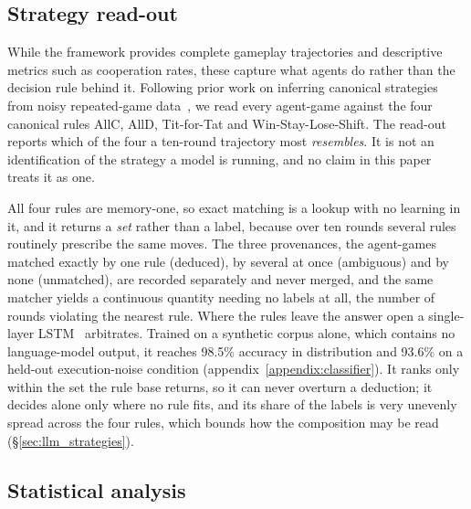 \documentclass[11pt,a4paper]{article}
\begin{document}
\subsection{Strategy read-out}\label{sec:readout}

While the framework provides complete gameplay trajectories and descriptive
metrics such as cooperation rates, these capture what agents do rather than the
decision rule behind it. Following prior work on inferring canonical strategies
from noisy repeated-game data~\cite{han2011role,Han2012ALIFEjournal,diStefanoIntention2023},
we read every agent-game against the four canonical rules AllC, AllD,
Tit-for-Tat and Win-Stay-Lose-Shift. The read-out reports which of the four a
ten-round trajectory most \emph{resembles}. It is not an identification of the
strategy a model is running, and no claim in this paper treats it as one.

All four rules are memory-one, so exact matching is a lookup with no learning
in it, and it returns a \emph{set} rather than a label, because over ten rounds
several rules routinely prescribe the same moves. The three provenances, the
agent-games matched exactly by one rule (deduced), by several at once
(ambiguous) and by none (unmatched), are recorded separately and never merged,
and the same matcher yields a continuous quantity needing no labels at all, the
number of rounds violating the nearest rule. Where the rules leave the answer
open a single-layer LSTM~\cite{lstm} arbitrates. Trained on a synthetic corpus alone, which contains no language-model output, it reaches 98.5\% accuracy in distribution and 93.6\% on a held-out
execution-noise condition (appendix~\ref{appendix:classifier}). It ranks only within the set the
rule base returns, so it can never overturn a deduction; it decides alone only
where no rule fits, and its share of the labels is very unevenly spread across
the four rules, which bounds how the composition may be read
(\S\ref{sec:llm_strategies}).

\subsection{Statistical analysis}\label{sec:stats}
\end{document}
